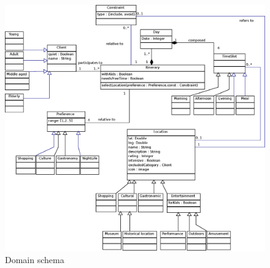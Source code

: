 \documentclass[11pt]{article} %
\begin{document}
\begin{figure}[h]
\centering
\includegraphics[width=\textwidth]{images/new_domain.eps}
\caption{Domain schema}
\label{fig:ClassDiagram}
\end{figure}
\end{document}
